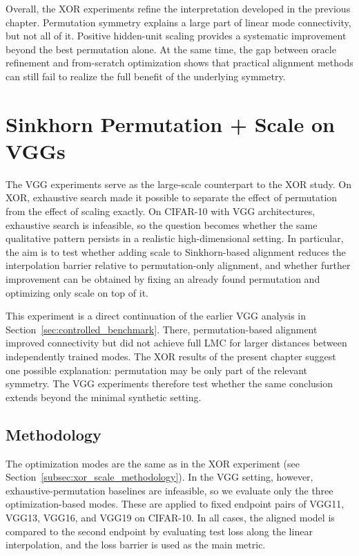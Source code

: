 \documentclass[11pt,a4paper]{report}
\begin{document}
Overall, the XOR experiments refine the interpretation developed in the previous chapter. Permutation symmetry explains a large part of linear mode connectivity, but not all of it. Positive hidden-unit scaling provides a systematic improvement beyond the best permutation alone. At the same time, the gap between oracle refinement and from-scratch optimization shows that practical alignment methods can still fail to realize the full benefit of the underlying symmetry.

\section{Sinkhorn Permutation + Scale on VGGs}

The VGG experiments serve as the large-scale counterpart to the XOR study. On XOR, exhaustive search made it possible to separate the effect of permutation from the effect of scaling exactly. On CIFAR-10 with VGG architectures, exhaustive search is infeasible, so the question becomes whether the same qualitative pattern persists in a realistic high-dimensional setting. In particular, the aim is to test whether adding scale to Sinkhorn-based alignment reduces the interpolation barrier relative to permutation-only alignment, and whether further improvement can be obtained by fixing an already found permutation and optimizing only scale on top of it.

This experiment is a direct continuation of the earlier VGG analysis in Section~\ref{sec:controlled_benchmark}. There, permutation-based alignment improved connectivity but did not achieve full LMC for larger distances between independently trained modes. The XOR results of the present chapter suggest one possible explanation: permutation may be only part of the relevant symmetry. The VGG experiments therefore test whether the same conclusion extends beyond the minimal synthetic setting.

\subsection{Methodology}

The optimization modes are the same as in the XOR experiment (see Section~\ref{subsec:xor_scale_methodology}). In the VGG setting, however, exhaustive-permutation baselines are infeasible, so we evaluate only the three optimization-based modes. These are applied to fixed endpoint pairs of VGG11, VGG13, VGG16, and VGG19 on CIFAR-10. In all cases, the aligned model is compared to the second endpoint by evaluating test loss along the linear interpolation, and the loss barrier is used as the main metric.
\end{document}
